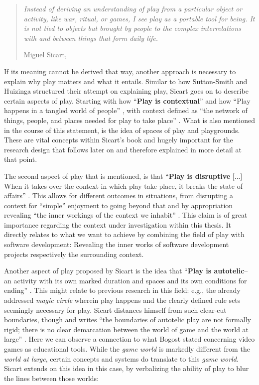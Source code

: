 \begin{quote}
  \textit{Instead of deriving an understanding of play from a particular object or activity, like war, ritual, or games, I see play as a portable tool for being. It is not tied to objects but brought by people to the complex interrelations with and between things that form daily life.}

  \footnotesize{Miguel Sicart, \cite[p. 2]{sicart2014play}}
\end{quote}

If its meaning cannot be derived that way, another approach is necessary to explain why play matters and what it entails. Similar to how Sutton-Smith and Huizinga structured their attempt on explaining play, Sicart goes on to describe certain aspects of play. Starting with how \enquote{\textbf{Play is contextual}} \cite[p. 6]{sicart2014play} and how \enquote{Play happens in a tangled world of people} \cite[p. 6]{sicart2014play}, with context defined as \enquote{the network of things, people, and places needed for play to take place} \cite[p. 7]{sicart2014play}. What is also mentioned in the course of this statement, is the idea of spaces of play and playgrounds. These are vital concepts within Sicart's book and hugely important for the research design that follows later on and therefore explained in more detail at that point.

The second aspect of play that is mentioned, is that \enquote{\textbf{Play is disruptive} [...] When it takes over the context in which play take place, it breaks the state of affairs} \cite[p. 14]{sicart2014play}. This allows for different outcomes in situations, from disrupting a context for \enquote{simple} enjoyment to going beyond that and by appropriation revealing \enquote{the inner workings of the context we inhabit} \cite[p. 15]{sicart2014play}. This claim is of great importance regarding the context under investigation within this thesis. It directly relates to what we want to achieve by combining the field of play with software development: Revealing the inner works of software development projects respectively the surrounding context.

Another aspect of play proposed by Sicart is the idea that \enquote{\textbf{Play is autotelic}--an activity with its own marked duration and spaces and its own conditions for ending} \cite[p. 16]{sicart2014play}. This might relate to previous research in this field: e.g., the already addressed \textit{magic circle} wherein play happens and the clearly defined rule sets seemingly necessary for play. Sicart distances himself from such clear-cut boundaries, though and writes \enquote{the boundaries of autotelic play are not formally rigid; there is no clear demarcation between the world of game and the world at large} \cite[p. 16]{sicart2014play}. Here we can observe a connection to what Bogost stated concerning video games as educational tools. While the \textit{game world} is markedly different from the \textit{world at large}, certain concepts and systems do translate to this \textit{game world}. Sicart extends on this idea in this case, by verbalizing the ability of play to blur the lines between those worlds:

